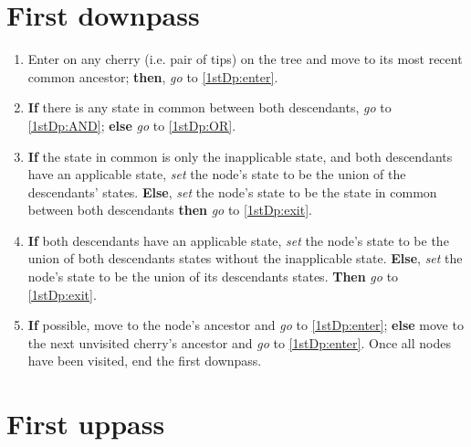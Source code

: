 \documentclass[a4paper,12pt]{article}
\begin{document}

\section{First downpass} \label{1stDp}

\begin{enumerate}
    \item Enter on any cherry (i.e. pair of tips) on the tree and move to its most recent common ancestor; \textbf{then}, \textit{go} to \ref{1stDp:enter}.
    \item \label{1stDp:enter} \textbf{If} there is any state in common between both descendants, \textit{go} to \ref{1stDp:AND}; \textbf{else} \textit{go} to \ref{1stDp:OR}.
    \item \label{1stDp:AND} \textbf{If} the state in common is only the inapplicable state, and both descendants have an applicable state, \textit{set} the node's state to be the union of the descendants' states. \textbf{Else}, \textit{set} the node's state to be the state in common between both descendants \textbf{then} \textit{go} to \ref{1stDp:exit}.
    \item \label{1stDp:OR}  \textbf{If} both descendants have an applicable state, \textit{set} the node's state to be the union of both descendants states without the inapplicable state. \textbf{Else}, \textit{set} the node's state to be the union of its descendants states. \textbf{Then} \textit{go} to \ref{1stDp:exit}.
    \item \label{1stDp:exit} \textbf{If} possible, move to the node's ancestor and \textit{go} to \ref{1stDp:enter}; \textbf{else} move to the next unvisited cherry's ancestor and \textit{go} to \ref{1stDp:enter}. Once all nodes have been visited, end the first downpass.
\end{enumerate}


\section{First uppass} \label{1stUp}
\end{document}
